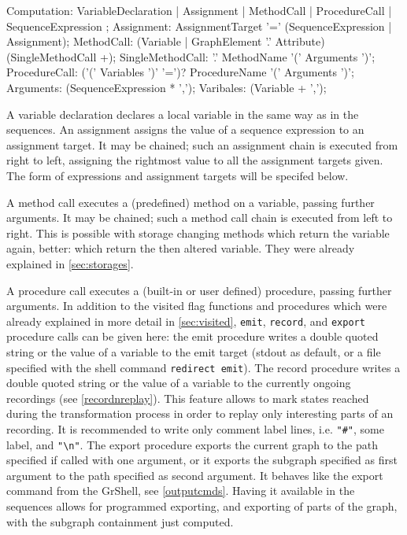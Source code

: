 \begin{rail} 
  Computation:
     VariableDeclaration |
     Assignment |
     MethodCall |
     ProcedureCall |
     SequenceExpression
  ;
	Assignment:	AssignmentTarget '=' (SequenceExpression | Assignment); 
	MethodCall: (Variable | GraphElement '.' Attribute) (SingleMethodCall +);
	SingleMethodCall: '.' MethodName '(' Arguments ')';
	ProcedureCall: ('(' Variables ')' '=')? ProcedureName '(' Arguments ')';
	Arguments: (SequenceExpression * ',');
	Varibales: (Variable + ',');
\end{rail}\label{recstmt}

A variable declaration declares a local variable in the same way as in the sequences.
An assignment assigns the value of a sequence expression to an assignment target.
It may be chained; such an assignment chain is executed from right to left, assigning the rightmost value to all the assignment targets given.
The form of expressions and assignment targets will be specifed below.

A method call executes a (predefined) method on a variable, passing further arguments.
It may be chained; such a method call chain is executed from left to right. 
This is possible with storage changing methods which return the variable again, better: which return the then altered variable. 
They were already explained in \ref{sec:storages}.

A procedure call executes a (built-in or user defined) procedure, passing further arguments.
In addition to the visited flag functions and procedures which were already explained in more detail in \ref{sec:visited},
\texttt{emit}, \texttt{record}, and \texttt{export} procedure calls can be given here: the emit procedure writes a double quoted string or the value of a variable to the emit target (stdout as default, or a file specified with the shell command \texttt{redirect emit}).
The record procedure writes a double quoted string or the value of a variable to the currently ongoing recordings (see \ref{recordnreplay}). This feature allows to mark states reached during the transformation process in order to replay only interesting parts of an recording. It is recommended to write only comment label lines, i.e. \verb/"#"/, some label, and \verb/"\n"/.
The export procedure exports the current graph to the path specified if called with one argument, or it exports the subgraph specified as first argument to the path specified as second argument.
It behaves like the export command from the GrShell, see \ref{outputcmds}.
Having it available in the sequences allows for programmed exporting, and exporting of parts of the graph, with the subgraph containment just computed.


